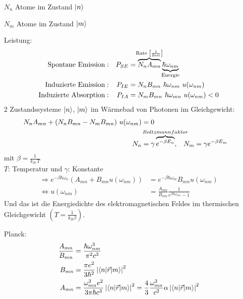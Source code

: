 		$N_n$ Atome im Zustand $\ket{n}$
		
		$N_m$ Atome im Zustand $\ket{m}$
		
		Leistung:
		\begin{align*}
		\text{Spontane Emission} &:  
		&P_{SE} &= 
		\overbrace{N_n A_{mn}}^{\mathclap{\text{Rate~} \left[\frac{1}{\text{Zeit}}\right]}} 
		\underbrace{\hbar \omega_{nm}}_{\mathclap{\text{Energie}}}\\
		\text{Induzierte Emission} &:
		&P_{IE} &= N_n B_{mn} ~\hbar \omega_{nm} ~u(\omega_{nm})\\
		\text{Induzierte Absorption} &:
		&P_{IA} &= N_m B_{mn} ~\hbar \omega_{mn} ~u(\omega_{nm}) < 0
		\end{align*}
		2 Zustandssysteme $\ket{n}$, $\ket{m}$ im Wärmebad von Photonen im Gleichgewicht: 
		\begin{align*}
		N_n A_{mn} + (N_n B_{mn} - N_m B_{mn}) ~u(\omega_{nm}) &= 0 \\
		N_n &= \gamma \overbrace{e^{- \beta E_n}}^{\mathclap{Boltzmannfaktor}} 
		,& N_m &= \gamma e^{-\beta E_m}
		\end{align*}
		mit $\beta = \frac{1}{k_B ~T}$ \\
		$T$: Temperatur und $\gamma$: Konstante
		\begin{align*}
		\Rightarrow 
		e^{-\beta \hbar \omega_n} \left( A_{mn} + B_{mn} u(\omega_{nm}) \right)
		&= e^{-\beta \hbar \omega_{m}} B_{mn} u(\omega_{nm}) \\
		\Leftrightarrow u(\omega_{nm}) &= \frac{A_{mn}}{B_{mn}} \frac{1}{e^{\beta \hbar \omega_{mn}} - 1}
		\end{align*}
		Und das ist die Energiedichte des elektromagnetischen Feldes im thermischen Gleichgewicht $\left(T=\frac{1}{k_B \beta}\right)$.
		
		Planck:
		\begin{align*}
		\frac{A_{mn}}{B_{mn}} &= \frac{\hbar \omega_{nm}^3}{\pi^2 c^3} \\
		B_{mn} &= \frac{\pi e^2}{3 \hbar^2} \left|\braket{n | \vec{r} | m}\right|^2 \\
		A_{mn} &= \frac{\omega_{mn}^3 e^2}{3 \pi \hbar c^3} \left|\braket{n | \vec{r} | m}\right|^2 
		= \frac{4}{3} \frac{\omega_{mn}^3}{c^2} \alpha \left|\braket{n | \vec{r} | m}\right|^2 
		\end{align*}